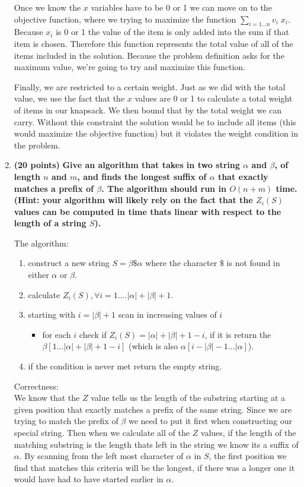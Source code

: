 \documentclass[11pt, oneside]{article}   	%
\begin{document}
\begin{enumerate}
Once we know the $x$ variables have to be 0 or 1 we can move on to the objective function, 
where we trying to maximize the function $\displaystyle\sum_{i = 1 \dots n}  v_{i} \; x_{i}$.
Because $x_{i}$ is 0 or 1 the value of the item is only added into the sum if that item is chosen. 
Therefore this function represents the total value of all of the items included in the solution. 
Because the problem definition asks for the maximum value, we're going to try and maximize this function. 

Finally, we are restricted to a certain weight. 
Just as we did with the total value, we use the fact that the $x$ values are 0 or 1 to calculate a total weight of items in our knapsack. 
We then bound that by the total weight we can carry. 
Without this constraint the solution would be to include all items (this would maximize the objective function) but it violates the weight condition in the problem. 


\item \textbf{(20 points)} 
\textbf{Give an algorithm that takes in two string $\alpha$ and $\beta$, of length $n$ and $m$, and finds the longest suffix of $\alpha$ that exactly matches a prefix of $\beta$. 
The algorithm should run in $O(n+m)$ time. 
(Hint: your algorithm will likely rely on the fact that the $Z_{i}(S)$ values can be computed in time thats linear with respect to the length of a string $S$). 
}

{\Large The algorithm:}
\begin{enumerate}
\item construct a new string $S = \beta\$\alpha$ where the character $\$$ is not found in either $\alpha$ or $\beta$. 
\item calculate $Z_{i}(S), \forall i = 1....|\alpha|+|\beta|+1$. 
\item starting with $i = |\beta|+1$ scan in increasing values of $i$
\begin{itemize}
\item for each $i$ check if $Z_{i}(S) = |\alpha|+|\beta|+1-i$, if it is return the $\beta[1... |\alpha|+|\beta|+1-i]$ (which is also $\alpha[i-|\beta|-1...|\alpha]$).
\end{itemize}
\item if the condition is never met return the empty string. 
\end{enumerate}

{\Large Correctness:}\\
We know that the $Z$ value tells us the length of the substring starting at a given position that exactly matches a prefix of the same string. 
Since we are trying to match the prefix of $\beta$ we need to put it first when constructing our special string. 
Then when we calculate all of the $Z$ values, if the length of the matching substring is the length thats left in the string we know its a suffix of $\alpha$. 
By scanning from the left most character of $\alpha$ in $S$, 
the first position we find that matches this criteria will be the longest, if there was a longer one it would have had to have started earlier in $\alpha$. 



\end{enumerate}
\end{document}
